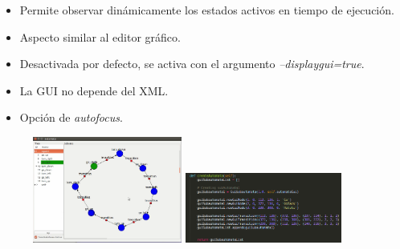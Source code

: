 \documentclass[notes,slidesec,a4]{seminar}
\begin{document}
\begin{hslide}

\begin{minipage}[t]{0.55\textwidth}
\begin{center}
	\begin{itemize}
	\item Permite observar dinámicamente los estados activos en tiempo de ejecución.
	\item Aspecto similar al editor gráfico.
	\item Desactivada por defecto, se activa con el argumento \textit{--displaygui=true}.
	\item La GUI no depende del XML.
	\item Opción de \textit{autofocus}.
	\end{itemize}
\end{center}
\end{minipage}\hfill
\begin{minipage}[t]{0.4\textwidth}
\begin{center}
	\begin{figure}
		\includegraphics[height=3.5cm]{imgs/newRuntimeGuiCPP.png}
		\includegraphics[height=2.3cm]{imgs/createAutomata.png}%
	\end{figure}
\end{center}
\end{minipage}
\end{hslide}

\end{document}
